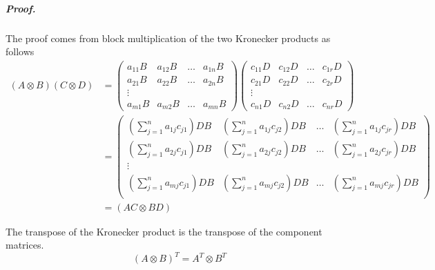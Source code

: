 \documentclass[11pt,a4paper]{report}
\begin{document}
\subparagraph{Proof.} The proof comes from block multiplication of the two Kronecker products as
follows
\begin{align*}\label{}
(A \otimes B)(C \otimes D) &= 
\begin{pmatrix}
a_{11}B & a_{12}B & \ldots & a_{1n}B\\
a_{21}B & a_{22}B & \ldots & a_{2n}B\\
\vdots& & &\\
a_{m1}B & a_{m2}B & \ldots & a_{mn}B
\end{pmatrix}
\begin{pmatrix}
c_{11}D & c_{12}D & \ldots & c_{1r}D\\
c_{21}D & c_{22}D & \ldots & c_{2r}D\\
\vdots& & &\\
c_{n1}D & c_{n2}D & \ldots & c_{nr}D
\end{pmatrix}\\
&=\begin{pmatrix}
(\sum_{j=1}^n a_{1j}c_{j1})DB & (\sum_{j=1}^n a_{1j}c_{j2})DB & \ldots &
  (\sum_{j=1}^n a_{1j}c_{jr})DB\\ 
(\sum_{j=1}^n a_{2j}c_{j1})DB & (\sum_{j=1}^n a_{2j}c_{j2})DB & \ldots & (\sum_{j=1}^n a_{2j}c_{jr})DB\\ 
\vdots&  &\\
(\sum_{j=1}^n a_{mj}c_{j1})DB & (\sum_{j=1}^n a_{mj}c_{j2})DB & \ldots & (\sum_{j=1}^n a_{mj}c_{jr})DB\\ 
\end{pmatrix}\\
&= (AC \otimes BD)
\end{align*}

The transpose of the Kronecker product is the transpose of the component
matrices.
\begin{equation}\label{eq:krontran}
(A \otimes B)^T = A^T \otimes B^T
\end{equation}
\end{document}
